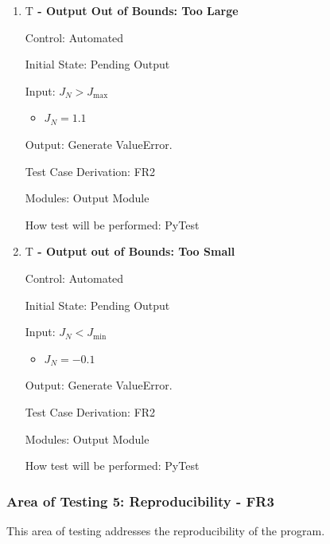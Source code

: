 \documentclass[12pt, titlepage]{article}
\newcounter{testnum} %
\begin{document}
\begin{enumerate}
\item{T\thetestnum \textbf{\label{T:out big} 
 - Output Out of Bounds: Too Large}}

Control: Automated
					
Initial State: Pending Output
					
Input: $J_N > J_{\max}$
\begin{itemize}
    \item $J_N = 1.1$
\end{itemize}

Output: Generate ValueError.

Test Case Derivation: FR2

Modules: Output Module

How test will be performed: PyTest

\item{T\thetestnum \textbf{\label{T:out small} 
 - Output out of Bounds: Too Small}}

Control: Automated
					
Initial State: Pending Output
					
Input: $J_N < J_{\min}$
\begin{itemize}
    \item $J_N = -0.1$
\end{itemize}
					
Output: Generate ValueError.

Test Case Derivation: FR2

Modules: Output Module

How test will be performed: PyTest

\end{enumerate}

\subsubsection{Area of Testing 5: Reproducibility - FR3}
This area of testing addresses the reproducibility of the program.
\end{document}
